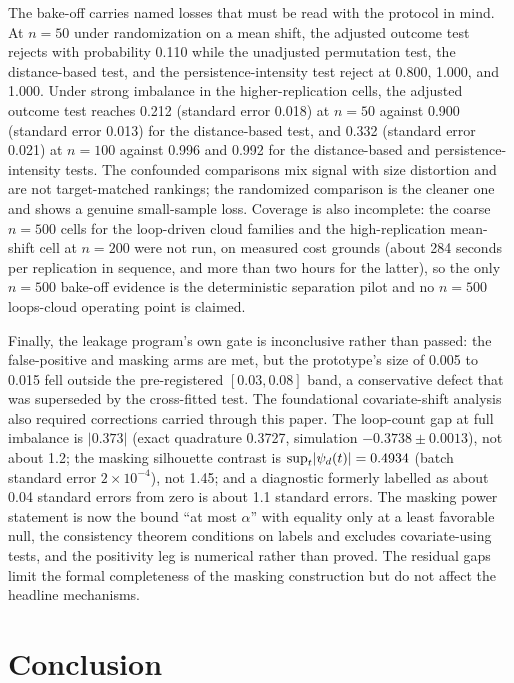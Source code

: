 The bake-off carries named losses that must be read with the protocol in mind. At $n=50$ under randomization on a mean shift, the adjusted outcome test rejects with probability 0.110 while the unadjusted permutation test, the distance-based test, and the persistence-intensity test reject at 0.800, 1.000, and 1.000. Under strong imbalance in the higher-replication cells, the adjusted outcome test reaches 0.212 (standard error 0.018) at $n=50$ against 0.900 (standard error 0.013) for the distance-based test, and 0.332 (standard error 0.021) at $n=100$ against 0.996 and 0.992 for the distance-based and persistence-intensity tests. The confounded comparisons mix signal with size distortion and are not target-matched rankings; the randomized comparison is the cleaner one and shows a genuine small-sample loss. Coverage is also incomplete: the coarse $n=500$ cells for the loop-driven cloud families and the high-replication mean-shift cell at $n=200$ were not run, on measured cost grounds (about 284 seconds per replication in sequence, and more than two hours for the latter), so the only $n=500$ bake-off evidence is the deterministic separation pilot and no $n=500$ loops-cloud operating point is claimed.

Finally, the leakage program's own gate is inconclusive rather than passed: the false-positive and masking arms are met, but the prototype's size of 0.005 to 0.015 fell outside the pre-registered $[0.03,0.08]$ band, a conservative defect that was superseded by the cross-fitted test. The foundational covariate-shift analysis also required corrections carried through this paper. The loop-count gap at full imbalance is $|0.373|$ (exact quadrature 0.3727, simulation $-0.3738 \pm 0.0013$), not about 1.2; the masking silhouette contrast is $\sup_t \lvert \psi_d(t)\rvert = 0.4934$ (batch standard error $2 \times 10^{-4}$), not 1.45; and a diagnostic formerly labelled as about 0.04 standard errors from zero is about 1.1 standard errors. The masking power statement is now the bound ``at most $\alpha$'' with equality only at a least favorable null, the consistency theorem conditions on labels and excludes covariate-using tests, and the positivity leg is numerical rather than proved. The residual gaps limit the formal completeness of the masking construction but do not affect the headline mechanisms.

\section{Conclusion}

